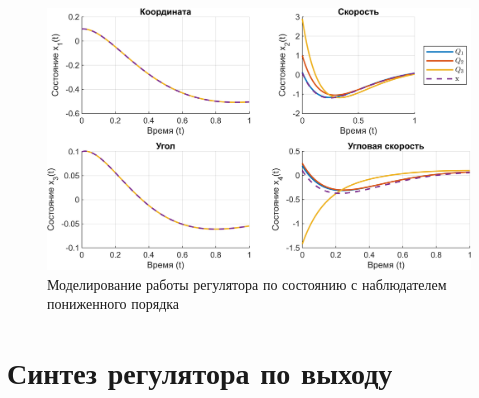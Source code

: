 \begin{figure}[H]
    \centering
    \includegraphics[width=\linewidth]{figs/3.3.reduced.png}
    \caption{Моделирование работы регулятора по состоянию 
    с наблюдателем пониженного порядка}
    \label{fig:3.3.reduced}
\end{figure}

\section{Синтез регулятора по выходу}

